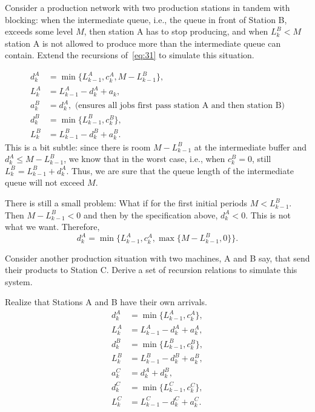 \begin{extra}
  Consider a production network with two production stations in tandem with blocking: when the intermediate queue, i.e., the queue in front of Station B, exceeds some level $M$, then station A has to stop producing, and when $L^B_k < M$ station A is not allowed to produce more than the intermediate queue can contain.
  Extend the recursions of~\cref{eq:31} to simulate this situation.
\begin{solution}
\begin{equation}
  \begin{split}
    d^A_k &= \min\{L_{k-1}^A, c_k^A, M-L^B_{k-1}\}, \\
    L_k^A &= L_{k-1}^A -d_k^A + a_k, \\
    a_k^B &= d_{k}^A, \text{ (ensures all jobs first pass station A and then station B)}\\
    d^B_k &= \min\{L_{k-1}^B, c_k^B\}, \\
    L_k^B &= L_{k-1}^B -d_k^B + a_k^B.
  \end{split}
\end{equation}
This is a bit subtle: since there is room $M-L^B_{k-1}$ at the
intermediate buffer and $d_k^A \leq M-L^B_{k-1}$, we know that in the
worst case, i.e., when $c_k^B=0$, still $L^B_k = L_{k-1}^B +
d_k^A$.
Thus, we are sure that the queue length of the intermediate queue will
not exceed $M$.

There is still  a small problem: What if for the first initial periods  $M<L^B_{k-1}$. Then $M-L^B_{k-1}<0$ and then by the specification above, $d_k^A < 0$. This is not what we want. Therefore, 
\begin{equation*}
  d^A_k = \min\{L_{k-1}^A, c_k^A, \max\{M-L^B_{k-1}, 0\}\}.
\end{equation*}
\end{solution}
\end{extra}

\begin{exercise}
  Consider another production situation with two machines, A and B
  say, that send their products to Station C. Derive a set of
  recursion relations to simulate this system. 
\begin{solution}
Realize that Stations A and B have their own arrivals. 
\begin{equation}
  \begin{split}
    d^A_k &= \min\{L_{k-1}^A, c_k^A\}, \\
    L_k^A &= L_{k-1}^A -d_k^A + a_k^A, \\
    d^B_k &= \min\{L_{k-1}^B, c_k^B\}, \\
    L_k^B &= L_{k-1}^B -d_k^B + a_k^B, \\
    a_k^C &= d_{k}^A+d_{k}^B,\\
    d^C_k &= \min\{L_{k-1}^C, c_k^C\}, \\
    L_k^C &= L_{k-1}^C -d_k^C + a_k^C.
  \end{split}
\end{equation}
\end{solution}
\end{exercise}


